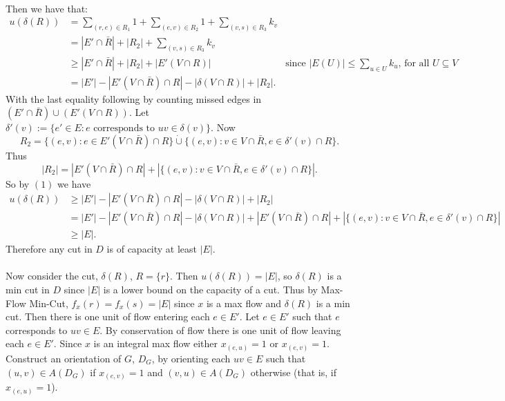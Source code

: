\documentclass[letterpaper,12pt,oneside,onecolumn]{article}
\begin{document}
\paragraph{}
Then we have that:
\begin{align}
u(\delta(R)) &= \sum_{(r,e) \in R_1} 1 + \sum_{(e,v) \in R_2} 1 + \sum_{(v,s) \in R_3} k_v \nonumber\\
&= |E' \cap \bar{R}| + |R_2| + \sum_{(v,s) \in R_3} k_v \nonumber\\
&\geq |E' \cap \bar{R}| + |R_2| + |E'(V \cap R)| &\text{since $|E(U)| \leq \sum_{u \in U} k_u$, for all $U \subseteq V$} \nonumber\\
&= |E'| - |E'(V \cap \bar{R}) \cap R| - |\delta(V\cap R)| + |R_2|. 
\end{align}
With the last equality following by counting missed edges in $(E' \cap \bar{R}) \cup (E'(V \cap R))$. Let $\delta'(v) := \{e' \in E: e \text{ corresponds to } uv \in \delta(v)\}$. Now $$R_2 = \{(e,v): e \in E'(V \cap \bar{R}) \cap R \} \dot\cup \{(e,v): v \in V \cap \bar{R}, e\in \delta'(v) \cap R \}.$$ Thus $$|R_2| = |E'(V \cap \bar{R}) \cap R| + |\{(e,v): v \in V \cap \bar{R}, e\in \delta'(v) \cap R \}|.$$
So by $(1)$ we have
\begin{align*}
u(\delta(R)) &\geq |E'| - |E'(V \cap \bar{R}) \cap R| - |\delta(V\cap R)| + |R_2| \\
&= |E'| - |E'(V \cap \bar{R}) \cap R| - |\delta(V\cap R)| + |E'(V \cap \bar{R}) \cap R| + |\{(e,v): v \in V \cap \bar{R}, e\in \delta'(v) \cap R \}| \\
&\geq |E|.
\end{align*}
Therefore any cut in $D$ is of capacity at least $|E|$.
\paragraph{}
Now consider the cut, $\delta(R)$, $R = \{r\}$. Then $u(\delta(R)) = |E|$, so $\delta(R)$ is a min cut in $D$ since $|E|$ is a lower bound on the capacity of a cut. Thus by Max-Flow Min-Cut, $f_x(r) = f_x(s) = |E|$ since $x$ is a max flow and $\delta(R)$ is a min cut. Then there is one unit of flow entering each $e \in E'$. Let $e \in E'$ such that $e$ corresponds to $uv \in E$. By conservation of flow there is one unit of flow leaving each $e \in E'$. Since $x$ is an integral max flow either $x_{(e,u)} = 1$ or $x_{(e,v)} = 1$. Construct an orientation of $G$, $D_G$, by orienting each $uv \in E$ such that $(u,v) \in A(D_G)$ if $x_{(e,v)} = 1$ and $(v,u) \in A(D_G)$ otherwise (that is, if $x_{(e,u)} = 1$).
\end{document}

